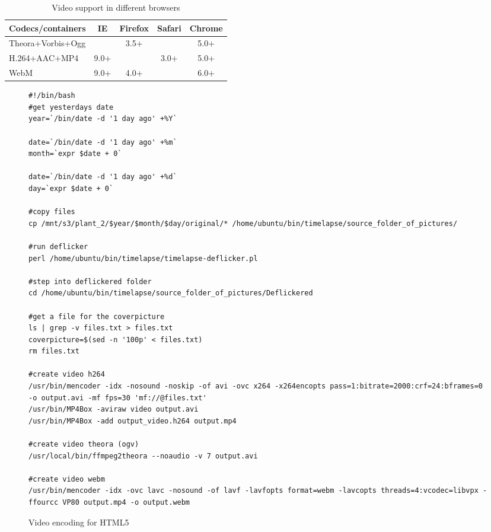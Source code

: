 \begin{table}\centering
\begin{tabular}{@{}lcccc@{}} \toprule
Codecs/containers & IE & Firefox & Safari & Chrome \\ \midrule
Theora+Vorbis+Ogg & ~                 & 3.5+    & ~      & 5.0+   \\ 
H.264+AAC+MP4     & 9.0+              & ~       & 3.0+   & 5.0+   \\ 
WebM              & 9.0+              & 4.0+    & ~      & 6.0+   \\ \bottomrule
\end{tabular}
\caption{Video support in different browsers \citep{pilgrim2010html5}}
\label{tab:videosupport}
\end{table}

\lstset{language=bash} 
\begin{figure}
\begin{lstlisting}
#!/bin/bash
#get yesterdays date
year=`/bin/date -d '1 day ago' +%Y`

date=`/bin/date -d '1 day ago' +%m`
month=`expr $date + 0`

date=`/bin/date -d '1 day ago' +%d`
day=`expr $date + 0`

#copy files
cp /mnt/s3/plant_2/$year/$month/$day/original/* /home/ubuntu/bin/timelapse/source_folder_of_pictures/

#run deflicker
perl /home/ubuntu/bin/timelapse/timelapse-deflicker.pl

#step into deflickered folder
cd /home/ubuntu/bin/timelapse/source_folder_of_pictures/Deflickered

#get a file for the coverpicture
ls | grep -v files.txt > files.txt 
coverpicture=$(sed -n '100p' < files.txt)
rm files.txt

#create video h264
/usr/bin/mencoder -idx -nosound -noskip -of avi -ovc x264 -x264encopts pass=1:bitrate=2000:crf=24:bframes=0 -o output.avi -mf fps=30 'mf://@files.txt'
/usr/bin/MP4Box -aviraw video output.avi
/usr/bin/MP4Box -add output_video.h264 output.mp4

#create video theora (ogv)
/usr/local/bin/ffmpeg2theora --noaudio -v 7 output.avi

#create video webm
/usr/bin/mencoder -idx -ovc lavc -nosound -of lavf -lavfopts format=webm -lavcopts threads=4:vcodec=libvpx -ffourcc VP80 output.mp4 -o output.webm

\end{lstlisting}
\caption{Video encoding for HTML5}
\label{fig:videoencoding}
\end{figure}

